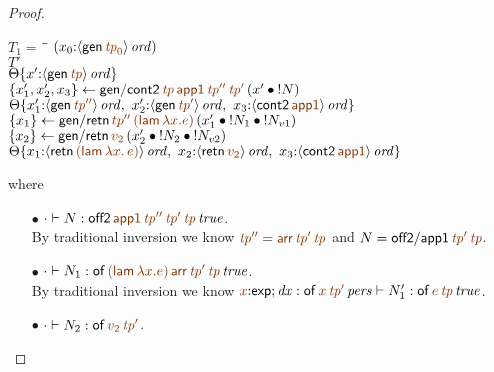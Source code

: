 \begin{proof}
\begin{description}
\begin{tabbing}
$T_1 = ~$ \= \qquad \= $(x_0{:}\istrue{\susp{{\sf gen}\,\lf{{\it tp}_0}}})$
\\
\>$T'$
\\
\>\>$\tackon{\Theta}{x'{:}\istrue{\susp{{\sf gen}\,\lf{{\it tp}}}}}$
\\
\>$\trstep{x_1', x_2', x_3}
     {{\sf gen/cont2}\,\lf{{\it tp}}\,\lf{\sf app1}\,
         \lf{{\it tp}''}\,\lf{{\it tp}'}\,
         (\tfuser{x'}{\tbangr{N}})}$
\\ %
\>\>$\tackon{\Theta}
     {x_1'{:}\istrue{\susp{{\sf gen}\,\lf{{\it tp}''}}}, ~
      x_2'{:}\istrue{\susp{{\sf gen}\,\lf{{\it tp}'}}}, ~
      x_3{:}\istrue{\susp{{\sf cont2}\,\lf{\sf app1}}}}$
\\
\>$\trstep{x_1}
     {{\sf gen/retn}\,\lf{tp''}\,\lf{({\sf lam}\,\lambda x.e)}\,}
         (\tfuser{x_1'}{\tfuser{\tbangr{N_1}}{\tbangr{N_{v1}}}})$
\\
\>$\trstep{x_2}
     {{\sf gen/retn}\,\lf{v_2}\,(\tfuser{x_2'}{\tfuser{\tbangr{N_2}}{\tbangr{N_{v2}}}})}$
\\
\>\>$\tackon{\Theta}{x_1{:}\istrue{\susp{{\sf retn}\,\lf{({\sf lam}\,\lambda x.\,e)}}}, ~
                   x_2{:}\istrue{\susp{{\sf retn}\,\lf{v_2}}}, ~
                   x_3{:}\istrue{\susp{{\sf cont2}\,\lf{\sf app1}}}}$
\end{tabbing}
where
\begin{itemize}
\item[$\bullet$] $\cdot \vdash N : \isconc{{\sf off2}\,\lf{\sf app1}\,\lf{{\it
      tp}''}\,\lf{{\it tp}'}\,\lf{{\it tp}}}$. \\ By traditional
  inversion we know $\lf{\it{tp}''} = \lf{{\sf arr}\,{\it tp}'\,{\it
      tp}}$ and $N = {\sf off2/app1}\,\lf{{\it tp}'}\,\lf{{\it tp}}$.
\item[$\bullet$] $\cdot \vdash N_1 : \isconc{{\sf of}\,\lf{({\sf lam}\,\lambda
    x.e)}\,\lf{{\sf arr}\,{\it tp}'\,{\it tp}}}$. \\
By traditional inversion we know 
    $\lf{x}{:}{\sf exp}; {\it dx} : \ispers{{\sf of}\,\lf{x}\,\lf{\it
      tp'}} \vdash N_1' : \isconc{{\sf of}\,\lf{e}\,\lf{\it
        tp}}$.
\item[$\bullet$] $\cdot \vdash N_2 : {\sf of}\,\lf{v_2}\,\lf{{\it tp}'}$.
\end{itemize}


\end{description}
\end{proof}
